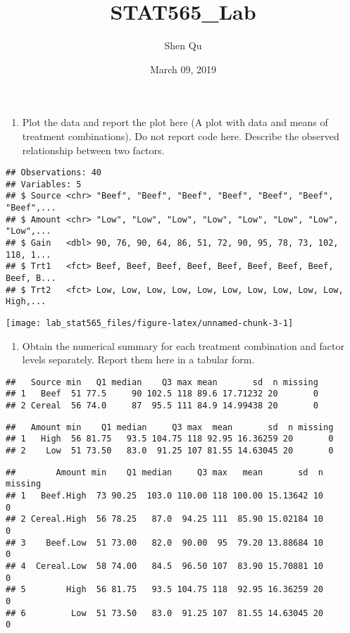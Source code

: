 \documentclass[]{article}
\title{STAT565\_Lab}
\author{Shen Qu}
\date{March 09, 2019}
\providecommand{\tightlist}{%
  \setlength{\itemsep}{0pt}\setlength{\parskip}{0pt}}
\begin{document}
\maketitle

\begin{enumerate}
\def\labelenumi{(\alph{enumi})}
\tightlist
\item
  Plot the data and report the plot here (A plot with data and means of
  treatment combinations). Do not report code here. Describe the
  observed relationship between two factors.
\end{enumerate}

\begin{verbatim}
## Observations: 40
## Variables: 5
## $ Source <chr> "Beef", "Beef", "Beef", "Beef", "Beef", "Beef", "Beef",...
## $ Amount <chr> "Low", "Low", "Low", "Low", "Low", "Low", "Low", "Low",...
## $ Gain   <dbl> 90, 76, 90, 64, 86, 51, 72, 90, 95, 78, 73, 102, 118, 1...
## $ Trt1   <fct> Beef, Beef, Beef, Beef, Beef, Beef, Beef, Beef, Beef, B...
## $ Trt2   <fct> Low, Low, Low, Low, Low, Low, Low, Low, Low, Low, High,...
\end{verbatim}

\texttt{[image: lab\_stat565\_files/figure-latex/unnamed-chunk-3-1]}

\begin{enumerate}
\def\labelenumi{(\alph{enumi})}
\setcounter{enumi}{1}
\tightlist
\item
  Obtain the numerical summary for each treatment combination and factor
  levels separately. Report them here in a tabular form.
\end{enumerate}

\begin{verbatim}
##   Source min   Q1 median    Q3 max mean       sd  n missing
## 1   Beef  51 77.5     90 102.5 118 89.6 17.71232 20       0
## 2 Cereal  56 74.0     87  95.5 111 84.9 14.99438 20       0
\end{verbatim}

\begin{verbatim}
##   Amount min    Q1 median     Q3 max  mean       sd  n missing
## 1   High  56 81.75   93.5 104.75 118 92.95 16.36259 20       0
## 2    Low  51 73.50   83.0  91.25 107 81.55 14.63045 20       0
\end{verbatim}

\begin{verbatim}
##        Amount min    Q1 median     Q3 max   mean       sd  n missing
## 1   Beef.High  73 90.25  103.0 110.00 118 100.00 15.13642 10       0
## 2 Cereal.High  56 78.25   87.0  94.25 111  85.90 15.02184 10       0
## 3    Beef.Low  51 73.00   82.0  90.00  95  79.20 13.88684 10       0
## 4  Cereal.Low  58 74.00   84.5  96.50 107  83.90 15.70881 10       0
## 5        High  56 81.75   93.5 104.75 118  92.95 16.36259 20       0
## 6         Low  51 73.50   83.0  91.25 107  81.55 14.63045 20       0
\end{verbatim}
\end{document}
